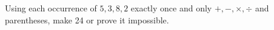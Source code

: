 Using each occurrence of $5,3,8,2$ exactly once and only $+,-,\times,\div$ and parentheses, make 24 or prove it impossible.
